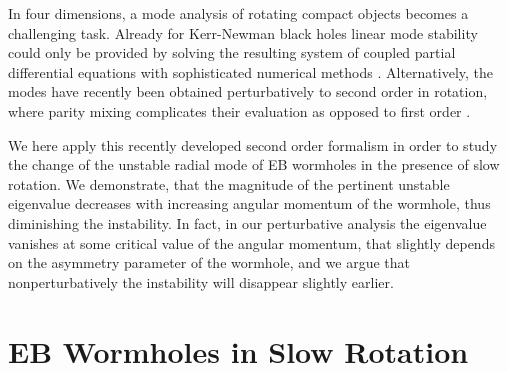 \documentclass{article}
\begin{document}
In four dimensions, a mode analysis of rotating compact objects becomes a challenging task.
Already for Kerr-Newman black holes linear mode stability could only be provided by solving the resulting system of coupled partial differential equations with sophisticated numerical methods \cite{Dias:2015wqa}.
Alternatively, the modes have recently been obtained perturbatively to second order in rotation, where parity mixing complicates their evaluation as opposed to first order \cite{Blazquez-Salcedo:2022eik}.

We here apply this recently developed second order formalism \cite{Blazquez-Salcedo:2022eik} in order to study the change of the unstable radial mode of EB wormholes in the presence of slow rotation.
We demonstrate, that the magnitude of the pertinent unstable eigenvalue decreases with increasing angular momentum of the wormhole, thus diminishing the instability.
In fact, in our perturbative analysis the eigenvalue 
%
{vanishes}
at some critical value of the angular momentum, that slightly depends on the asymmetry parameter of the wormhole, {and we argue that nonperturbatively the instability will disappear slightly 
earlier}.

 
 
\section{EB Wormholes in Slow Rotation}
\end{document}
